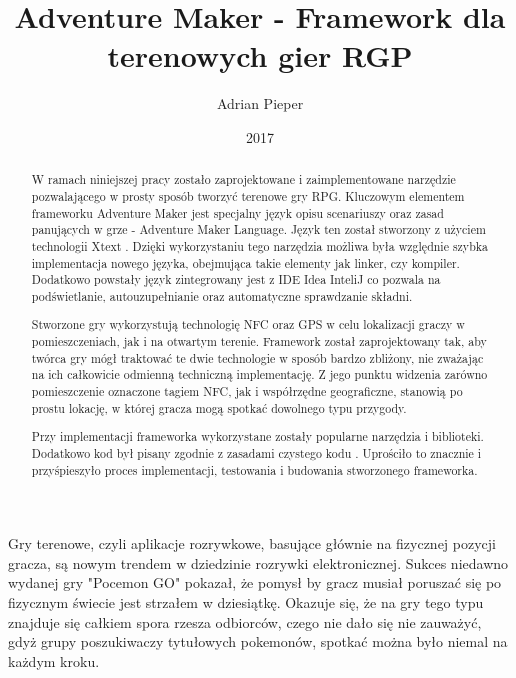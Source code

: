 \documentclass{xmgr}
\author   {Adrian Pieper}
\title    {Adventure Maker - Framework dla terenowych gier RGP}
\date     {2017}
\begin{document}
\begin{abstract}
  W ramach niniejszej pracy zostało zaprojektowane i zaimplementowane narzędzie pozwalającego w prosty sposób tworzyć terenowe gry RPG. Kluczowym elementem frameworku Adventure Maker jest specjalny język opisu scenariuszy oraz zasad panujących w grze - Adventure Maker Language. Język ten został stworzony z użyciem technologii Xtext \cite{Xtext:2017:Doc}. Dzięki wykorzystaniu tego narzędzia możliwa była względnie szybka implementacja nowego języka, obejmująca takie elementy jak linker, czy kompiler. Dodatkowo powstały język zintegrowany jest z IDE Idea InteliJ co pozwala na podświetlanie, autouzupełnianie oraz automatyczne sprawdzanie składni.
  
  Stworzone gry wykorzystują technologię NFC oraz GPS w celu lokalizacji graczy w pomieszczeniach, jak i na otwartym terenie. Framework został zaprojektowany tak, aby twórca gry mógł traktować te dwie technologie w sposób bardzo zbliżony, nie zważając na ich  całkowicie odmienną techniczną implementację. Z jego punktu widzenia zarówno pomieszczenie oznaczone tagiem NFC, jak i współrzędne geograficzne, stanowią po prostu lokację, w której gracza mogą spotkać dowolnego typu przygody. 
  
  Przy implementacji frameworka wykorzystane zostały popularne narzędzia i biblioteki. Dodatkowo kod był pisany zgodnie z zasadami czystego kodu \cite{CleanCode:2005}. Uprościło to znacznie i przyśpieszyło proces implementacji, testowania i budowania stworzonego frameworka.
\end{abstract}


\maketitle

\introduction

Gry terenowe, czyli aplikacje rozrywkowe, basujące głównie na fizycznej pozycji gracza, są nowym trendem w dziedzinie rozrywki elektronicznej. Sukces niedawno wydanej gry "Pocemon GO" pokazał, że pomysł by gracz musiał poruszać się po fizycznym świecie jest strzałem w dziesiątkę. Okazuje się, że na gry tego typu znajduje się całkiem spora rzesza odbiorców, czego nie dało się nie zauważyć, gdyż grupy poszukiwaczy tytułowych pokemonów, spotkać można było niemal na każdym kroku.
\end{document}
